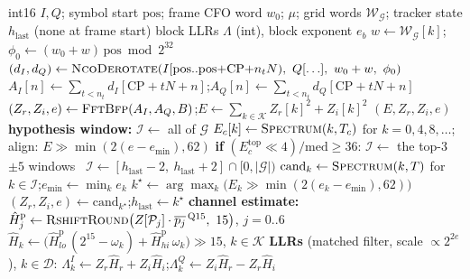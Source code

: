 \begin{algorithm}[H]
\caption{Integer symbol demodulation, all modes (fixed-point twin and C port).}
\label{alg:demod_int}
\begin{algorithmic}[1]
\Require int16 $I, Q$; symbol start $\mathrm{pos}$; frame CFO word $w_0$; $\mu$; grid words $\mathcal{W}_{\mathcal G}$; tracker state $h_{\mathrm{last}}$ (none at frame start)
\Ensure block LLRs $\Lambda$ (int), block exponent $e_b$
 
    \State $w \gets \mathcal{W}_{\mathcal G}[k]$;\quad $\phi_0 \gets (w_0 + w)\,\mathrm{pos} \bmod 2^{32}$ 
    \State $(d_I, d_Q) \gets \textsc{NcoDerotate}(I[\mathrm{pos} .. \mathrm{pos}{+}\mathrm{CP}{+}n_t N),\ Q[\ldots],\ w_0 + w,\ \phi_0)$
    \State $A_I[n] \gets \sum_{t < n_t} d_I[\mathrm{CP} + tN + n]$;\quad $A_Q[n] \gets \sum_{t < n_t} d_Q[\mathrm{CP} + tN + n]$ 
    \State $(Z_r, Z_i, e) \gets \textsc{FftBfp}(A_I, A_Q, B)$;\quad $E \gets \sum_{k \in \mathcal{K}} Z_r[k]^2 + Z_i[k]^2$
    \State \Return $(E, Z_r, Z_i, e)$
\EndFunction
\Statex
\State \textbf{hypothesis window:}
 
    \State $\mathcal{I} \gets$ all of $\mathcal{G}$
     
        \State $E_c[k] \gets \textsc{Spectrum}(k, T_c)$ for $k = 0, 4, 8, \ldots$; align: $E \gg \min(2(e - e_{\min}), 62)$
        \State \textbf{if} $(E_c^{\mathrm{top}} \ll 4) / \mathrm{med} \ge 36$: $\mathcal{I} \gets$ the top-3 $\pm5$ windows 
    \EndIf
\Else\ $\mathcal{I} \gets [h_{\mathrm{last}} - 2,\ h_{\mathrm{last}} + 2] \cap [0, |\mathcal{G}|)$ 
\EndIf
\State $\mathrm{cand}_k \gets \textsc{Spectrum}(k, T)$ for $k \in \mathcal{I}$;\quad $e_{\min} \gets \min_k e_k$
\State $k^\star \gets \arg\max_k \big(E_k \gg \min(2(e_k - e_{\min}), 62)\big)$ 
\State $(Z_r, Z_i, e) \gets \mathrm{cand}_{k^\star}$;\quad $h_{\mathrm{last}} \gets k^\star$
\Statex
\State \textbf{channel estimate:} $\hat H^{\mathrm{p}}_j \gets \textsc{RshiftRound}\big(Z[\mathcal{P}_j] \cdot \overline{p_j}^{\,\mathrm{Q15}},\ 15\big)$, $j = 0..6$ 
\State $\hat H_k \gets \big(\hat H^{\mathrm{p}}_{lo}\,(2^{15} - \omega_k) + \hat H^{\mathrm{p}}_{hi}\,\omega_k\big) \gg 15$, $k \in \mathcal{K}$ 
\Statex
\State \textbf{LLRs} (matched filter, scale $\propto 2^{2e}$), $k \in \mathcal{D}$: $\Lambda^I_k \gets Z_r \hat H_r + Z_i \hat H_i$;\quad $\Lambda^Q_k \gets Z_i \hat H_r - Z_r \hat H_i$

\end{algorithmic}
\end{algorithm}

